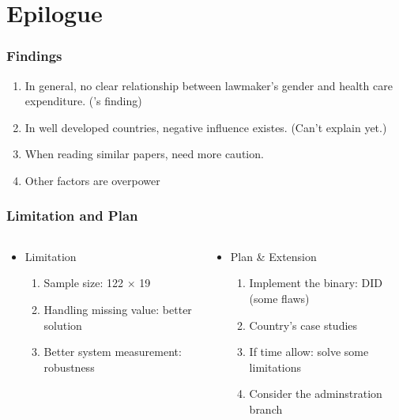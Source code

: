 \documentclass[12pt]{beamer}
\begin{document}

\section{Epilogue}

\begin{frame}
	\frametitle{Findings}
	\begin{enumerate}
		\item In general, no clear relationship between lawmaker's gender and health care expenditure. ('s finding)
		\item In well developed countries, negative influence existes. (Can't explain yet.)
		\item When reading similar papers, need more caution.
		\item Other factors are overpower 
	\end{enumerate}
\end{frame}

\begin{frame}
	\frametitle{Limitation and Plan}


\begin{columns}
	\begin{column}{0.5\textwidth}
\begin{itemize}
\item Limitation
		\begin{enumerate}
	\item Sample size: 122 $\times$ 19
	\item Handling missing value: better solution
	\item Better system measurement: robustness 
		\end{enumerate}
\end{itemize}
	\end{column}
	\begin{column}{0.5\textwidth}  

\begin{itemize}
\item Plan \& Extension
	\begin{enumerate}
		\item Implement the binary: DID (some flaws)
		\item Country's case studies
		\item If time allow: solve some limitations
		\item Consider the adminstration branch
	\end{enumerate}
\end{itemize}
	\end{column}
\end{columns}
	
\end{frame}
\end{document}
